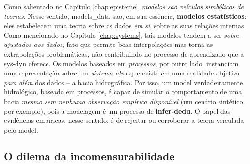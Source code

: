 \documentclass[./main.tex]{subfiles}
\begin{document}
\noindent Como salientado no Capítulo \ref{chap:episteme}, \textit{modelos são veículos simbólicos de teorias}. Nesse sentido, \gls{models_data} são, em sua essência, \textbf{modelos estatísticos}: eles estabelecem uma \gls{teoria} sobre os dados \textit{em si}, sobre as suas relações internas. Como mencionado no Capítulo \ref{chap:systems}, tais modelos tendem a ser \textit{sobre-ajustados aos dados}, fato que permite boas interpolações mas torna as extrapolações problemáticas, não contribuindo no processo de aprendizado que a \gls{sys-dyn} oferece. Os modelos baseados em \textit{processos}, por outro lado, instanciam uma representação sobre um \textit{sistema-alvo} que existe em uma realidade objetiva \textit{para além} dos dados -- a bacia hidrográfica. Por isso, um \gls{model} verdadeiramente hidrológico, baseado em processos, é capaz de simular o comportamento de uma bacia \textit{mesmo sem nenhuma observação empírica disponível} (um cenário sintético, por exemplo), pois a modelagem é um processo de \textbf{\gls{infer-dedu}}. O papel das evidências empíricas, nesse sentido, é de rejeitar ou corroborar a \gls{teoria} veiculada pelo \gls{model}.

\subsection{O dilema da incomensurabilidade} \label{sec:hydro:incomm}
\end{document}
